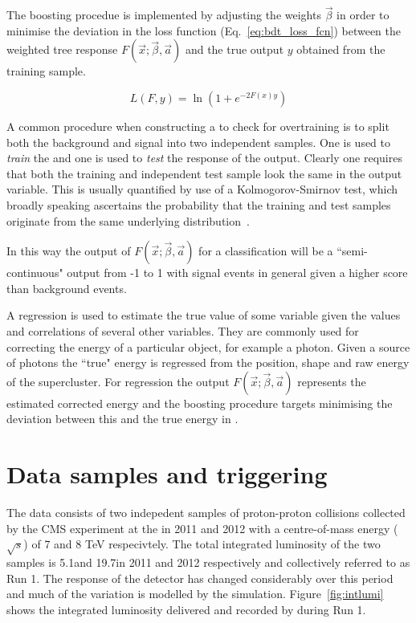 The boosting procedue is implemented by adjusting the weights $\vec{\beta}$ in order to minimise the deviation in the loss function (Eq.~\ref{eq:bdt_loss_fcn}) between the weighted tree response $F(\vec{x};\vec{\beta},\vec{a})$ and the true output $y$ obtained from the training sample. 

\begin{equation}
  L(F,y) = \ln(1+e^{-2F(x)y})
  \label{eq:bdt_loss_fcn}
\end{equation}

A common procedure when constructing a \BDT to check for overtraining is to split both the background and signal into two independent samples. One is used to \emph{train} the \BDT and one is used to \emph{test} the response of the output. Clearly one requires that both the training and independent test sample look the same in the output variable. This is usually quantified by use of a Kolmogorov-Smirnov test, which broadly speaking ascertains the probability that the training and test samples originate from the same underlying distribution~\cite{kol_smir}. 

In this way the output of $F(\vec{x};\vec{\beta},\vec{a})$ for a classification \BDT will be a ``semi-continuous" output from -1 to 1 with signal events in general given a higher score than background events.

A regression \BDT is used to estimate the true value of some variable given the values and correlations of several other variables. They are commonly used for correcting the energy of a particular object, for example a photon. Given a \MC source of photons the ``true" energy is regressed from the position, shape and raw energy of the supercluster. For regression \BDTs the output $F(\vec{x};\vec{\beta},\vec{a})$ represents the estimated corrected energy and the boosting procedure targets minimising the deviation between this and the true energy in \MC. 

\section{Data samples and triggering}

The data consists of two indepedent samples of proton-proton collisions collected by the CMS experiment at the \LHC in 2011 and 2012 with a centre-of-mass energy ($\sqrt{s}$) of 7 and 8 TeV respecivtely. The total integrated luminosity of the two samples is 5.1\fb and 19.7\fb in 2011 and 2012 respectively and collectively referred to as \LHC Run 1. The response of the detector has changed considerably over this period and much of the variation is modelled by the \MC simulation. Figure~\ref{fig:intlumi} shows the integrated luminosity delivered and recorded by \CMS during \LHC Run 1.

